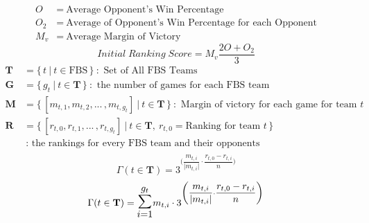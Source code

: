 \documentclass[onecolumn,fleqn,leqno]{minimal}
\begin{document}
	\fontsize{14}{13.5}\selectfont
	\begin{align*}
		O &=\: \text{Average Opponent's Win Percentage}\\
		O_2 &=\: \text{Average of Opponent's Win Percentage for each Opponent}\\
		M_v &=\: \text{Average Margin of Victory}
	\end{align*}
	\begin{equation}
		Initial\;Ranking\;Score=M_v\frac{2O+O_2}{3}
	\end{equation}
	\begin{align*}
		\mathbf{T} &= \{\,t \:|\: t \in \text{FBS}\,\}\::
			\text{ Set of All FBS Teams}\\
		\mathbf{G} &= \{\, g_t \:|\: t \in \mathbf{T}\,\}\::
			\text{ the number of games for each FBS team }\\
		\mathbf{M} &= \{\, [m_{t,1},m_{t,2},...\,,m_{t,g_t}] \:|\: t \in \mathbf{T} \,\}\::
			\text{ Margin of victory for each game for team } t\\
		\mathbf{R} &= \{\, [r_{t,0},r_{t,1},...\,,r_{t,g_t}] \:|\: 
			t \in \mathbf{T},\: r_{t,0}=\text{Ranking for team }t \,\}\\
			&\::\text{ the rankings for every FBS team and their opponents}\\
	\end{align*}
	\begin{equation}
		\Gamma(t \in \mathbf{T})=
		3^{
			\biggl(\dfrac{m_{t,i}}{\lvert m_{t,i}\rvert}
			\cdot\dfrac{r_{t,0}-r_{t,i}}{n}\biggr)
		}
	\end{equation}
	\begin{equation}
		\Gamma(t \in \mathbf{T})=
		\mathlarger{\mathlarger{\mathlarger{\sum}}_{i=1}^{g_t}}
		m_{t,i}\cdot
		3^{
			\biggl(\dfrac{m_{t,i}}{\lvert m_{t,i}\rvert}
			\cdot\dfrac{r_{t,0}-r_{t,i}}{n}\biggr)
		}
	\end{equation}
\end{document}
